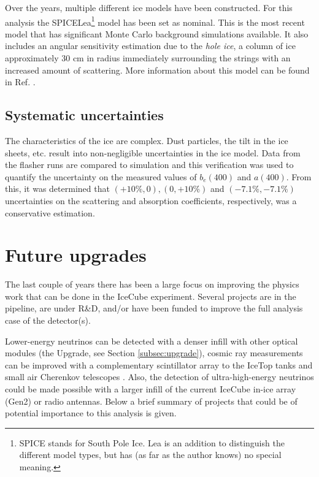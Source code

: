 Over the years, multiple different ice models have been constructed. For this analysis the SPICELea\footnote{SPICE stands for South Pole Ice. Lea is an addition to distinguish the different model types, but has (as far as the author knows) no special meaning.} model has been set as nominal. This is the most recent model that has significant Monte Carlo background simulations available. It also includes an angular sensitivity estimation due to the \textit{hole ice}, a column of ice approximately 30 cm in radius immediately surrounding the strings with an increased amount of scattering. More information about this model can be found in Ref. \cite{1412998}.
\subsection{Systematic uncertainties}
The characteristics of the ice are complex. Dust particles, the tilt in the ice sheets, etc. result into non-negligible uncertainties in the ice model. Data from the flasher runs are compared to simulation and this verification was used to quantify the uncertainty on the measured values of $b_e(400)$ and $a(400)$. From this, it was determined that $(+10\%,0), (0,+10\%)$ and $(-7.1\%,-7.1\%)$ uncertainties on the scattering and absorption coefficients, respectively, was a conservative estimation.



\section{Future upgrades}
The last couple of years there has been a large focus on improving the physics work that can be done in the IceCube experiment. Several projects are in the pipeline, are under R\&D, and/or have been funded to improve the full analysis case of the detector(s).

Lower-energy neutrinos can be detected with a denser infill with other optical modules (the Upgrade, see Section \ref{subsec:upgrade}), cosmic ray measurements can be improved with a complementary scintillator array to the IceTop tanks \cite{Collaboration:2017tdy} and small air Cherenkov telescopes \cite{Auffenberg:2017vwc}. Also, the detection of ultra-high-energy neutrinos could be made possible with a larger infill of the current IceCube in-ice array (Gen2) or radio antennas. Below a brief summary of projects that could be of potential importance to this analysis is given.

